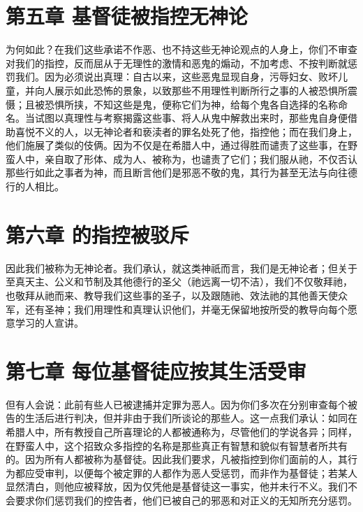 
\section{第五章 基督徒被指控无神论}

为何如此？在我们这些承诺不作恶、也不持这些无神论观点的人身上，你们不审查对我们的指控，反而屈从于无理性的激情和恶鬼的煽动，不加考虑、不按判断就惩罚我们。因为必须说出真理：自古以来，这些恶鬼显现自身，污辱妇女、败坏儿童，并向人展示如此恐怖的景象，以致那些不用理性判断所行之事的人被恐惧所震慑；且被恐惧所挟，不知这些是鬼，便称它们为神，给每个鬼各自选择的名称命名。当试图以真理性与考察揭露这些事、将人从鬼中解救出来时，那些鬼自身便借助喜悦不义的人，以无神论者和亵渎者的罪名处死了他，指控他；而在我们身上，他们施展了类似的伎俩。因为不仅是在希腊人中，通过得胜而谴责了这些事，在野蛮人中，亲自取了形体、成为人、被称为，也谴责了它们；我们服从祂，不仅否认那些行如此之事者为神，而且断言他们是邪恶不敬的鬼，其行为甚至无法与向往德行的人相比。\par


\section{第六章 的指控被驳斥}

因此我们被称为无神论者。我们承认，就这类神祇而言，我们是无神论者；但关于至真天主、公义和节制及其他德行的圣父（祂远离一切不洁），我们不仅敬拜祂，也敬拜从祂而来、教导我们这些事的圣子，以及跟随祂、效法祂的其他善天使众军，还有圣神；我们用理性和真理认识他们，并毫无保留地按所受的教导向每个愿意学习的人宣讲。\par


\section{第七章 每位基督徒应按其生活受审}

但有人会说：此前有些人已被逮捕并定罪为恶人。因为你们多次在分别审查每个被告的生活后进行判决，但并非由于我们所谈论的那些人。这一点我们承认：如同在希腊人中，所有教授自己所喜理论的人都被通称为，尽管他们的学说各异；同样，在野蛮人中，这个招致众多指控的名称是那些真正有智慧和貌似有智慧者所共有的。因为所有人都被称为基督徒。因此我们要求，凡被指控到你们面前的人，其行为都应受审判，以便每个被定罪的人都作为恶人受惩罚，而非作为基督徒；若某人显然清白，则他应被释放，因为仅凭他是基督徒这一事实，他并未行不义。我们不会要求你们惩罚我们的控告者，他们已被自己的邪恶和对正义的无知所充分惩罚。\par

